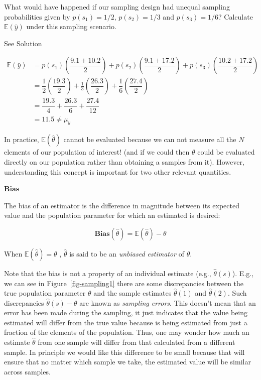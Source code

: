 \documentclass[
  letterpaper,
  DIV=11,
  numbers=noendperiod]{scrartcl}
\begin{document}
\begin{tcolorbox}
What would have happened if our sampling design had unequal sampling
probabilities given by \(p(s_1) = 1/2\), \(p(s_2) = 1/3\) and
\(p(s_3) = 1/6\)? Calculate \(\mathbb{E}(\hat{y})\) under this sampling
scenario.

See Solution

\[
\begin{aligned}
\mathbb{E}(\bar{y}) &= p(s_1) \left(\dfrac{9.1+10.2}{2}\right) +  p(s_2) \left(\dfrac{9.1+17.2}{2}\right) +  p(s_3) \left(\dfrac{10.2+17.2}{2}\right)\\
&= \dfrac{1}{2}\left(\dfrac{19.3}{2} \right) + \frac{1}{3} \left(\dfrac{26.3}{2}\right) + \dfrac{1}{6}\left(\dfrac{27.4}{2} \right)\\
&= \dfrac{19.3}{4}  + \dfrac{26.3}{6} + \dfrac{27.4}{12} \\
&= 11.5 \neq \mu_y
\end{aligned}
\]

\end{tcolorbox}

In practice, \(\mathbb{E}(\hat{\theta})\) cannot be evaluated because we
can not measure all the \(N\) elements of our population of interest!
(and if we could then \(\theta\) could be evaluated directly on our
population rather than obtaining a samples from it). However,
understanding this concept is important for two other relevant
quantities.

\textbf{Bias}

The bias of an estimator is the difference in magnitude between its
expected value and the population parameter for which an estimated is
desired:

\[
\textbf{Bias}(\hat{\theta}) = \mathbb{E}(\hat{\theta}) - \theta
\]

When \(\mathbb{E}(\hat{\theta}) = \theta\) , \(\hat{\theta}\) is said to
be an \emph{unbiased estimator} of \(\theta\).

Note that the bias is not a property of an individual estimate (e.g.,
\(\hat{\theta}(s)\)). E.g., we can see in Figure~\ref{fig-sampling1}
there are some discrepancies between the true population parameter
\(\theta\) and the sample estimates \(\hat{\theta}(1)\) and
\(\hat{\theta}(2)\). Such discrepancies \(\hat{\theta}(s) - \theta\) are
known as \emph{sampling errors}. This doesn't mean that an error has
been made during the sampling, it just indicates that the value being
estimated will differ from the true value because is being estimated
from just a fraction of the elements of the population. Thus, one may
wonder how much an estimate \(\hat{\theta}\) from one sample will differ
from that calculated from a different sample. In principle we would like
this difference to be small because that will ensure that no matter
which sample we take, the estimated value will be similar across
samples.
\end{document}
